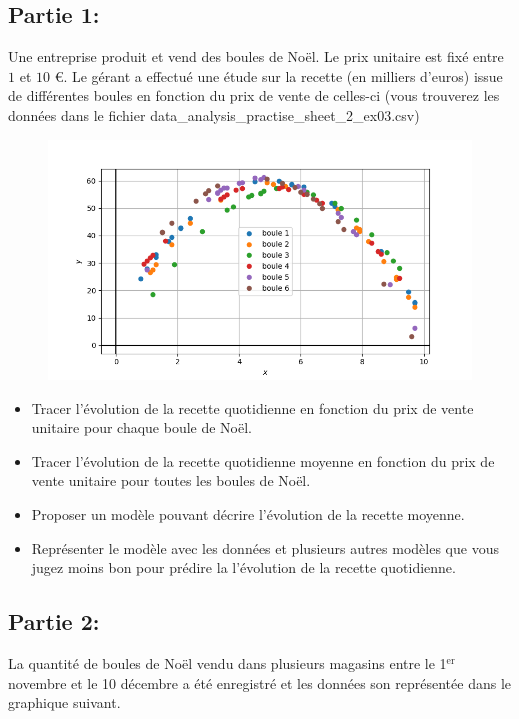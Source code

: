 \documentclass[11pt, french]{article}
\begin{document}
\subsection*{Partie 1:}
Une entreprise produit et vend des boules de Noël. Le prix unitaire est fixé entre $1$ et $10$ €. Le gérant a effectué une étude sur la recette (en milliers d'euros) issue de différentes boules en fonction du prix de vente de celles-ci (vous trouverez les données dans le fichier data\_analysis\_practise\_sheet\_2\_ex03.csv)

\begin{figure}[!h]
    \center
    \includegraphics[scale=0.7]{assets/serie_2_exo_3_figure_5.png}
    \label{fig:p_s_2_exo3-fig1}
\end{figure}

\begin{itemize}
    \item Tracer l'évolution de la recette quotidienne en fonction du prix de vente unitaire pour chaque boule de Noël.
    \item Tracer l'évolution de la recette quotidienne moyenne en fonction du prix de vente unitaire pour toutes les boules de Noël.
    \item Proposer un modèle pouvant décrire l'évolution de la recette moyenne.
    \item Représenter le modèle avec les données et plusieurs autres modèles que vous jugez moins bon pour prédire la l'évolution de la recette quotidienne.
\end{itemize}

\subsection*{Partie 2:}
La quantité de boules de Noël vendu dans plusieurs magasins entre le 1$^\text{er}$ novembre et le 10 décembre a été enregistré et les données son représentée dans le graphique suivant.
\end{document}
